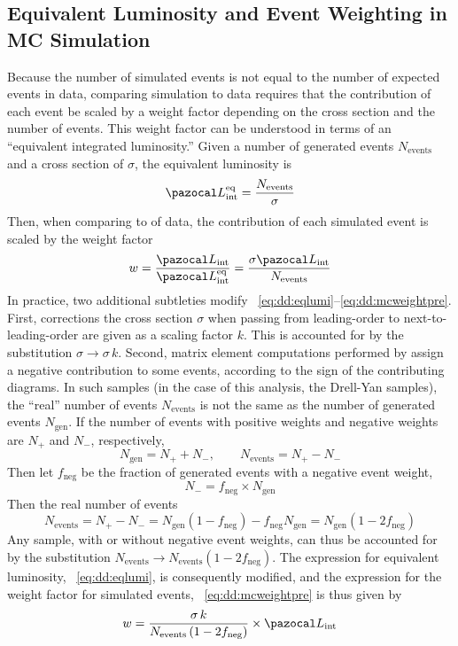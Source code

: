 \subsection{Equivalent Luminosity and Event Weighting in MC Simulation}
\label{sec:dd:EqLumi}
Because the number of simulated events is not equal to the number of expected events in data, comparing simulation to data requires that the contribution of each event be scaled by a weight factor depending on the cross section and the number of events.
This weight factor can be understood in terms of an ``equivalent integrated luminosity.''
Given a number of generated events $N_\text{events}$ and a cross section of $\sigma$, the equivalent luminosity is
\begin{equation}
  \intlumi^\text{eq} = \frac{N_\text{events}}{\sigma}
  \label{eq:dd:eqlumi}
\end{equation}
Then, when comparing to \intlumi of data, the contribution of each simulated event is scaled by the weight factor
\begin{equation}
  w = \frac{\intlumi}{\intlumi^\text{eq}} = \frac{\sigma\intlumi}{N_\text{events}}
  \label{eq:dd:mcweightpre}
\end{equation}
In practice, two additional subtleties modify \Eqs~\ref{eq:dd:eqlumi}--\ref{eq:dd:mcweightpre}.
First, corrections the cross section $\sigma$ when passing from leading-order to next-to-leading-order are given as a scaling factor $k$.
This is accounted for by the substitution $\sigma \to \sigma \, k$.
Second, matrix element computations performed by \MGvATNLO assign a negative contribution to some events, according to the sign of the contributing diagrams.
In such samples (in the case of this analysis, the Drell-Yan samples), the ``real'' number of events $N_\text{events}$ is not the same as the number of generated events $N_\text{gen}$.
If the number of events with positive weights and negative weights are $N_+$ and $N_-$, respectively,
$$N_{\text{gen}} = N_+ + N_-,\quad\quad N_\text{events} = N_+ - N_-$$
Then let $f_\text{neg}$ be the fraction of generated events with a negative event weight, \ie $$N_- = f_\text{neg} \times N_\text{gen}$$
Then the real number of events
\begin{equation}
  N_\text{events} = N_+ - N_- = N_\text{gen}\left(1 - f_\text{neg}\right) - f_\text{neg}N_\text{gen} = N_\text{gen}\left( 1-2f_\text{neg} \right)
  \label{eq:dd:neventsfrac}
\end{equation}
Any sample, with or without negative event weights, can thus be accounted for by the substitution $N_\text{events} \to N_\text{events}\left( 1-2f_\text{neg} \right)$.
The expression for equivalent luminosity, \Eq~\ref{eq:dd:eqlumi}, is consequently modified, and the expression for the weight factor for simulated events, \Eq~\ref{eq:dd:mcweightpre} is thus given by
\begin{equation}
  w = \frac{\sigma\,k}{N_\text{events}\left( 1-2f_\text{neg} \right)} \times \intlumi
  \label{eq:dd:mcweight}
\end{equation}


